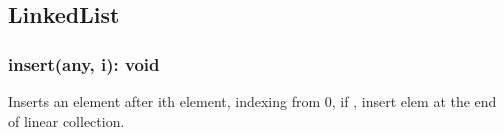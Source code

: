 \subsection{LinkedList}
\subsubsection*{insert(any, i): void}
Inserts an element after ith element, indexing from 0, if , insert elem at the end of linear collection.
%
%
%
%
%
%
%
%
